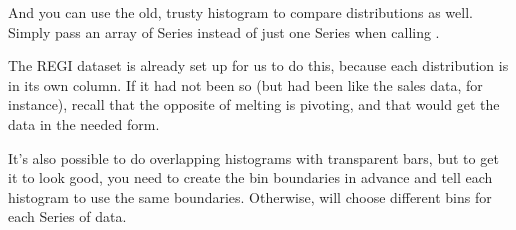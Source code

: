 \documentclass[letterpaper,10pt,english]{jupyterBook}
\begin{document}
\noindent{}

\sphinxAtStartPar
And you can use the old, trusty histogram to compare distributions as well.  Simply pass an array of Series instead of just one Series when calling .

\begin{sphinxVerbatim}[commandchars=\\\{\}]
 \PYG{p}{[} \PYG{p}{[}\PYG{p}{]} \PYG{p}{[}\PYG{p}{]} \PYG{p}{]} \PYG{p}{[}   \PYG{p}{]} 
\end{sphinxVerbatim}

\noindent{}

\sphinxAtStartPar
The REGI dataset is already set up for us to do this, because each distribution is in its own column.  If it had not been so (but had been like the sales data, for instance), recall that the opposite of melting is pivoting, and that would get the data in the needed form.

\sphinxAtStartPar
It’s also possible to do overlapping histograms with transparent bars, but to get it to look good, you need to create the bin boundaries in advance and tell each histogram to use the same boundaries.  Otherwise,  will choose different bins for each Series of data.
\end{document}
